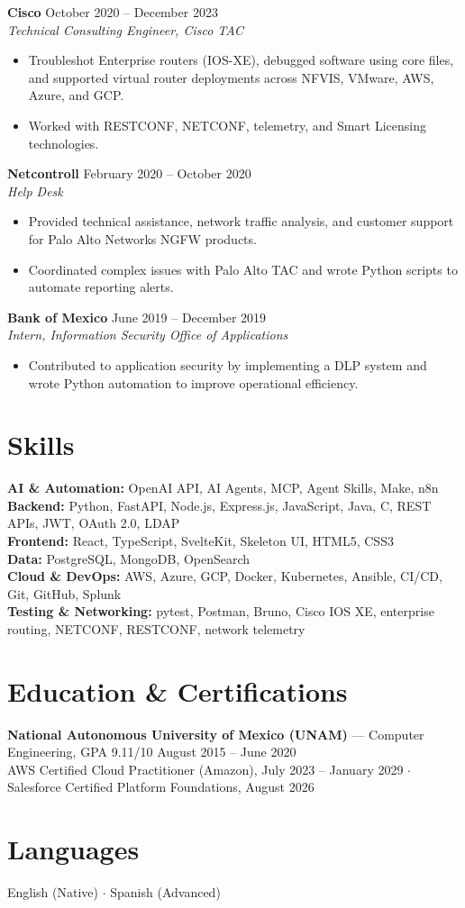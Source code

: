\documentclass[10pt,letterpaper]{article}
\newcommand{\role}[3]{\textbf{#1} \hfill #3\\\textit{#2}\par}
\begin{document}
\role{Cisco}{Technical Consulting Engineer, Cisco TAC}{October 2020 -- December 2023}
\begin{itemize}
  \item Troubleshot Enterprise routers (IOS-XE), debugged software using core files, and supported virtual router deployments across NFVIS, VMware, AWS, Azure, and GCP.
  \item Worked with RESTCONF, NETCONF, telemetry, and Smart Licensing technologies.
\end{itemize}

\role{Netcontroll}{Help Desk}{February 2020 -- October 2020}
\begin{itemize}
  \item Provided technical assistance, network traffic analysis, and customer support for Palo Alto Networks NGFW products.
  \item Coordinated complex issues with Palo Alto TAC and wrote Python scripts to automate reporting alerts.
\end{itemize}

\role{Bank of Mexico}{Intern, Information Security Office of Applications}{June 2019 -- December 2019}
\begin{itemize}
  \item Contributed to application security by implementing a DLP system and wrote Python automation to improve operational efficiency.
\end{itemize}

\section*{Skills}
\textbf{AI \& Automation:} OpenAI API, AI Agents, MCP, Agent Skills, Make, n8n\\
\textbf{Backend:} Python, FastAPI, Node.js, Express.js, JavaScript, Java, C, REST APIs, JWT, OAuth 2.0, LDAP\\
\textbf{Frontend:} React, TypeScript, SvelteKit, Skeleton UI, HTML5, CSS3\\
\textbf{Data:} PostgreSQL, MongoDB, OpenSearch\\
\textbf{Cloud \& DevOps:} AWS, Azure, GCP, Docker, Kubernetes, Ansible, CI/CD, Git, GitHub, Splunk\\
\textbf{Testing \& Networking:} pytest, Postman, Bruno, Cisco IOS XE, enterprise routing, NETCONF, RESTCONF, network telemetry

\section*{Education \& Certifications}
\textbf{National Autonomous University of Mexico (UNAM)} --- Computer Engineering, GPA 9.11/10 \hfill August 2015 -- June 2020\\
AWS Certified Cloud Practitioner (Amazon), July 2023 -- January 2029 $\cdot$ Salesforce Certified Platform Foundations, August 2026

\section*{Languages}
English (Native) $\cdot$ Spanish (Advanced)
\end{document}
